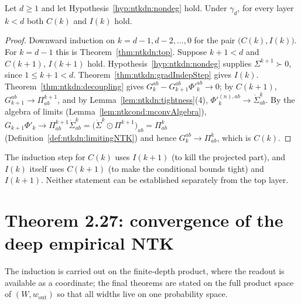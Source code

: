 \begin{theorem}\label{thm:ntkdn:induction}
  \leanok
Let $d\ge1$ and let Hypothesis~\ref{hyp:ntkdn:nondeg} hold. Under $\gamma_d$, for
every layer $k<d$ both $C(k)$ and $I(k)$ hold.
\end{theorem}

\begin{proof}
  \leanok
Downward induction on $k=d-1,d-2,\dots,0$ for the pair $\bigl(C(k),I(k)\bigr)$. For $k=d-1$ this is Theorem~\ref{thm:ntkdn:top}. Suppose $k+1<d$ and $C(k+1)$, $I(k+1)$ hold. Hypothesis~\ref{hyp:ntkdn:nondeg} supplies $\Sigma^{k+1}\succ0$, since $1\le k+1<d$. Theorem~\ref{thm:ntkdn:gradIndepStep} gives $I(k)$. Theorem~\ref{thm:ntkdn:decoupling} gives $G_k^{ab}-G_{k+1}^{ab}\Phi'^{ab}_k\to0$; by $C(k+1)$, $G_{k+1}^{ab}\to\Pi^{k+1}_{ab}$, and by Lemma~\ref{lem:ntkdn:tightness}(4), $\Phi'^{(n),ab}_k\to\dot\Sigma^k_{ab}$. By the algebra of limits (Lemma~\ref{lem:ntkcond:mconvAlgebra}), $G_{k+1}\Phi'_k\to\Pi^{k+1}_{ab}\dot\Sigma^k_{ab}=\bigl(\dot\Sigma^k\odot\Pi^{k+1}\bigr)_{ab}=\Pi^k_{ab}$ (Definition~\ref{def:ntkdn:limitingNTK}) and hence $G_k^{ab}\to\Pi^k_{ab}$, which is $C(k)$.
\end{proof}

\begin{remark}\label{rmk:ntkdn:whyJoint}
The induction step for $C(k)$ uses $I(k+1)$ (to kill the projected part), and $I(k)$ itself uses $C(k+1)$ (to make the conditional bounds tight) and $I(k+1)$. Neither statement can be established separately from the top layer.
\end{remark}


\section{Theorem 2.27: convergence of the deep empirical NTK}\label{sec:ntkdn:main}

The induction is carried out on the finite-depth product, where the readout is available as a coordinate;
the final theorems are stated on the full product space of $(W,w_{\mathrm{out}})$ so that all
widths live on one probability space.

